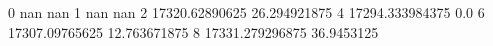 0 nan nan
1 nan nan
2 17320.62890625 26.294921875
4 17294.333984375 0.0
6 17307.09765625 12.763671875
8 17331.279296875 36.9453125

